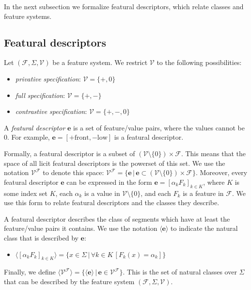 \documentclass[11pt, oneside]{article}   	%
\begin{document}
\noindent In the next subsection we formalize featural descriptors, which relate classes and feature systems.

\subsection{Featural descriptors}

Let $(\mathcal F, \Sigma, \mathcal V)$ be a feature system. We restrict $\mathcal V$ to the following possibilities: \begin{itemize}
    \item \textit{privative specification}: $\mathcal V = \{ +, 0 \}$
    \item \textit{full specification}: $\mathcal V = \{ +, - \}$
    \item \textit{contrastive specification}: $\mathcal V = \{ +, -, 0 \}$
    \end{itemize}

\noindent A \textit{featural descriptor} $\mathbf{e}$ is a set of feature/value pairs, where the values cannot be $0$. For example, $\mathbf{e} = [+ \text{front}, - \text{low}]$ is a featural descriptor.

Formally, a featural descriptor is a subset of $(\mathcal V \setminus \{0\}) \times \mathcal F$. This means that the space of all licit featural descriptors is the powerset of this set. We use the notation $\mathcal V^\mathcal F$ to denote this space: $\mathcal V^\mathcal F = \{ \mathbf{e} \, | \, \mathbf{e} \subset (\mathcal V \setminus \{0\}) \times \mathcal F \}$. Moreover, every featural descriptor $\mathbf{e}$ can be expressed in the form $\mathbf{e} = [\alpha_k F_k]_{k \in K}$, where $K$ is some index set $K$, each $\alpha_k$ is a value in $\mathcal V \setminus \{ 0 \}$, and each $F_k$ is a feature in $\mathcal F$. We use this form to relate featural descriptors and the classes they describe.

A featural descriptor describes the class of segments which have at least the feature/value pairs it contains. We use the notation $\langle \mathbf{e} \rangle$ to indicate the natural class that is described by $\mathbf{e}$: \begin{itemize}
    \item $\langle [\alpha_k F_k]_{k \in K} \rangle = \{x \in \Sigma \, | \, \forall k \in K \, [ F_k(x) = \alpha_k ] \}$
    \end{itemize}

\noindent Finally, we define $\langle \mathcal V^\mathcal F \rangle = \{ \langle \mathbf{e} \rangle \, | \, \mathbf{e} \in \mathcal V^\mathcal F \}$. This is the set of natural classes over $\Sigma$ that can be described by the feature system $(\mathcal F, \Sigma, \mathcal V)$.
\end{document}
